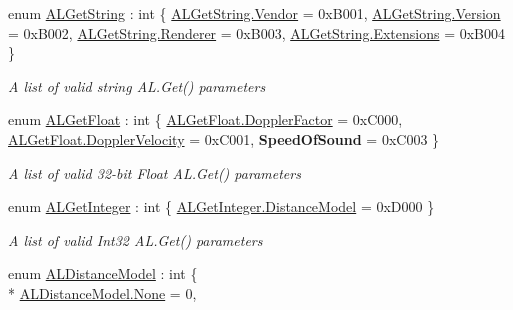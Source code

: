 \begin{DoxyCompactItemize}
enum \hyperlink{namespace_open_t_k_1_1_audio_1_1_open_a_l_a91d05be8853c30fa516eb64e21e62256}{A\-L\-Get\-String} \-: int \{ \hyperlink{namespace_open_t_k_1_1_audio_1_1_open_a_l_a91d05be8853c30fa516eb64e21e62256aec9ceefe0c19f4c029008c23e3c947b7}{A\-L\-Get\-String.\-Vendor} = 0x\-B001, 
\hyperlink{namespace_open_t_k_1_1_audio_1_1_open_a_l_a91d05be8853c30fa516eb64e21e62256a34b6cd75171affba6957e308dcbd92be}{A\-L\-Get\-String.\-Version} = 0x\-B002, 
\hyperlink{namespace_open_t_k_1_1_audio_1_1_open_a_l_a91d05be8853c30fa516eb64e21e62256a07b20ae970048fc2002d756f27acc863}{A\-L\-Get\-String.\-Renderer} = 0x\-B003, 
\hyperlink{namespace_open_t_k_1_1_audio_1_1_open_a_l_a91d05be8853c30fa516eb64e21e62256a5e2f5f3c24ae8c6ab3eca618826b0e23}{A\-L\-Get\-String.\-Extensions} = 0x\-B004
 \}
\begin{DoxyCompactList}\small\item\em A list of valid string A\-L.\-Get() parameters\end{DoxyCompactList}\item 
enum \hyperlink{namespace_open_t_k_1_1_audio_1_1_open_a_l_a186800e5822b4b259bdad2876e434ef4}{A\-L\-Get\-Float} \-: int \{ \hyperlink{namespace_open_t_k_1_1_audio_1_1_open_a_l_a186800e5822b4b259bdad2876e434ef4adeb45b937996fe2a07b470a0e6c72835}{A\-L\-Get\-Float.\-Doppler\-Factor} = 0x\-C000, 
\hyperlink{namespace_open_t_k_1_1_audio_1_1_open_a_l_a186800e5822b4b259bdad2876e434ef4a98446ef93f75b605f796f0cb5ad442c2}{A\-L\-Get\-Float.\-Doppler\-Velocity} = 0x\-C001, 
{\bfseries Speed\-Of\-Sound} = 0x\-C003
 \}
\begin{DoxyCompactList}\small\item\em A list of valid 32-\/bit Float A\-L.\-Get() parameters\end{DoxyCompactList}\item 
enum \hyperlink{namespace_open_t_k_1_1_audio_1_1_open_a_l_a3560143bfe164a914f3557fc766cfa04}{A\-L\-Get\-Integer} \-: int \{ \hyperlink{namespace_open_t_k_1_1_audio_1_1_open_a_l_a3560143bfe164a914f3557fc766cfa04a30c381a9cd5e3ae3410dc1c0da3ad2d0}{A\-L\-Get\-Integer.\-Distance\-Model} = 0x\-D000
 \}
\begin{DoxyCompactList}\small\item\em A list of valid Int32 A\-L.\-Get() parameters\end{DoxyCompactList}\item 
enum \hyperlink{namespace_open_t_k_1_1_audio_1_1_open_a_l_ac70a7de41b3623396e48d614cc5f032c}{A\-L\-Distance\-Model} \-: int \{ \\*
\hyperlink{namespace_open_t_k_1_1_audio_1_1_open_a_l_ac70a7de41b3623396e48d614cc5f032ca6adf97f83acf6453d4a6a4b1070f3754}{A\-L\-Distance\-Model.\-None} = 0, 

\end{DoxyCompactItemize}
